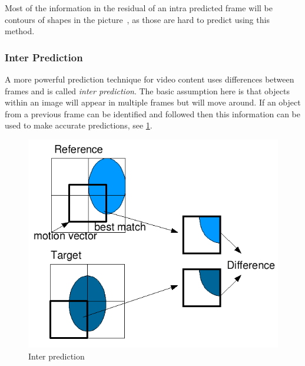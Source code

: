 


Most of the information in the residual of an intra predicted frame will be contours of shapes in the picture~\cite{Vcodex_HEVC_Walkthrough}, as those are hard to predict using this method.

\subsubsection{Inter Prediction}
A more powerful prediction technique for video content uses differences between frames and is called \textit{inter prediction}. The basic assumption here is that objects within an image will appear in multiple frames but will move around. If an object from a previous frame can be identified and followed then this information can be used to make accurate predictions, see \cref{fig:inter_prediction}.

\begin{figure}
    \centering
    \includegraphics[scale=0.6]{pictures/wikipedia/public-domain/Interframe_prediction_cropped.png}
    \caption{Inter prediction}
    \label{fig:inter_prediction}
\end{figure}

